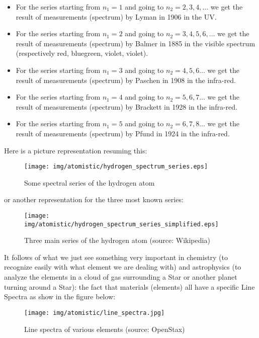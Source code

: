 	\begin{itemize}
		\item For the series starting from $n_1=1$ and going to $n_2=2,3,4,...$  we get the result of measurements (spectrum) by Lyman in 1906 in the UV.
		
		\item For the series starting from $n_1=2$ and going to $n_2=3,4,5,6,\ldots$  we get the result of measurements (spectrum) by Balmer in 1885 in the visible spectrum (respectively red, bluegreen, violet, violet).
		
		\item For the series starting from $n_1=3$ and going to $n_2=4,5,6...$  we get the result of measurements (spectrum) by Paschen in 1908 in the infra-red.
		
		\item For the series starting from $n_1=4$ and going to $n_2=5,6,7...$  we get the result of measurements (spectrum) by Brackett in 1928 in the infra-red.
		
		\item For the series starting from $n_1=5$ and going to $n_2=6,7,8...$  we get the result of measurements (spectrum) by Pfund in 1924 in the infra-red.
	\end{itemize}
	Here is a picture representation resuming this:
	\begin{figure}[H]
		\centering
		\texttt{[image: img/atomistic/hydrogen\_spectrum\_series.eps]}
		\caption{Some spectral series of the hydrogen atom}
	\end{figure}
	or another representation for the three most known series:
	\begin{figure}[H]
		\centering
		\texttt{[image: img/atomistic/hydrogen\_spectrum\_series\_simplified.eps]}
		\caption[Three main series of the hydrogen atom]{Three main series of the hydrogen atom (source: Wikipedia)}
	\end{figure}
	It follows of what we just see something very important in chemistry (to recognize easily with what element we are dealing with) and astrophysics (to analyze the elements in a cloud of gas surrounding a Star or another planet turning around a Star): the fact that materials (elements) all have a specific Line Spectra as show in the figure below:
	\begin{figure}[H]
		\centering
		\texttt{[image: img/atomistic/line\_spectra.jpg]}
		\caption[Line spectra of various elements]{Line spectra of various elements (source: OpenStax)}
	\end{figure}

